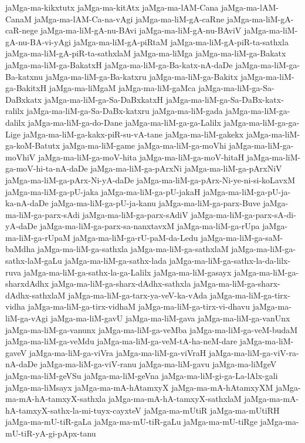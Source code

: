 {jaMga-ma-kikxtutx
jaMga-ma-kitAtx
jaMga-ma-lAM-Cana
jaMga-ma-lAM-CanaM
jaMga-ma-lAM-Ca-na-vAgi
jaMga-ma-liM-gA-caRne
jaMga-ma-liM-gA-caR-nege
jaMga-ma-liM-gA-nu-BAvi
jaMga-ma-liM-gA-nu-BAviV
jaMga-ma-liM-gA-nu-BA-vi-yAgi
jaMga-ma-liM-gA-piRtaM
jaMga-ma-liM-gA-piR-ta-sathxla
jaMga-ma-liM-gA-piR-ta-sathxlaM
jaMga-ma-liMga
jaMga-ma-liM-ga-Bakatx
jaMga-ma-liM-ga-BakatxH
jaMga-ma-liM-ga-Ba-katx-nA-daDe
jaMga-ma-liM-ga-Ba-katxnu
jaMga-ma-liM-ga-Ba-katxru
jaMga-ma-liM-ga-Bakitx
jaMga-ma-liM-ga-BakitxH
jaMga-ma-liMgaM
jaMga-ma-liM-gaMca
jaMga-ma-liM-ga-Sa-DaBxkatx
jaMga-ma-liM-ga-Sa-DaBxkatxH
jaMga-ma-liM-ga-Sa-DaBx-katx-ralilx
jaMga-ma-liM-ga-Sa-DaBx-katxru
jaMga-ma-liM-gada
jaMga-ma-liM-ga-dalilx
jaMga-ma-liM-ga-do-Dane
jaMga-ma-liM-ga-ga-Lalilx
jaMga-ma-liM-ga-ga-Lige
jaMga-ma-liM-ga-kakx-piR-su-vA-tane
jaMga-ma-liM-gakekx
jaMga-ma-liM-ga-koM-Batutx
jaMga-ma-liM-game
jaMga-ma-liM-ga-moVhi
jaMga-ma-liM-ga-moVhiV
jaMga-ma-liM-ga-moV-hita
jaMga-ma-liM-ga-moV-hitaH
jaMga-ma-liM-ga-moV-hi-ta-nA-daDe
jaMga-ma-liM-ga-pArxNi
jaMga-ma-liM-ga-pArxNiV
jaMga-ma-liM-ga-pArx-Ni-yA-daDe
jaMga-ma-liM-ga-pArx-Ni-ye-ni-si-koLavxM
jaMga-ma-liM-ga-pU-jaka
jaMga-ma-liM-ga-pU-jakaH
jaMga-ma-liM-ga-pU-ja-ka-nA-daDe
jaMga-ma-liM-ga-pU-ja-kanu
jaMga-ma-liM-ga-parx-Buve
jaMga-ma-liM-ga-parx-sAdi
jaMga-ma-liM-ga-parx-sAdiV
jaMga-ma-liM-ga-parx-sA-di-yA-daDe
jaMga-ma-liM-ga-parx-sa-nanxtavxM
jaMga-ma-liM-ga-rUpa
jaMga-ma-liM-ga-rUpaM
jaMga-ma-liM-ga-rU-paM-da-Ledu
jaMga-ma-liM-ga-saM-baMdha
jaMga-ma-liM-ga-sathxla
jaMga-ma-liM-ga-sathxlaM
jaMga-ma-liM-ga-sathx-laM-gaLu
jaMga-ma-liM-ga-sathx-lada
jaMga-ma-liM-ga-sathx-la-da-lilx-ruva
jaMga-ma-liM-ga-sathx-la-ga-Lalilx
jaMga-ma-liM-gasayx
jaMga-ma-liM-ga-sharxdAdhx
jaMga-ma-liM-ga-sharx-dAdhx-sathxla
jaMga-ma-liM-ga-sharx-dAdhx-sathxlaM
jaMga-ma-liM-ga-tarx-ya-veV-ka-vAda
jaMga-ma-liM-ga-tirx-vidha
jaMga-ma-liM-ga-tirx-vidhaM
jaMga-ma-liM-ga-tirx-vi-dhavu
jaMga-ma-liM-ga-vAgi
jaMga-ma-liM-gavU
jaMga-ma-liM-gava
jaMga-ma-liM-ga-vanUnx
jaMga-ma-liM-ga-vanunx
jaMga-ma-liM-ga-veMba
jaMga-ma-liM-ga-veM-budaM
jaMga-ma-liM-ga-veMdu
jaMga-ma-liM-ga-veM-tA-ha-neM-dare
jaMga-ma-liM-gaveV
jaMga-ma-liM-ga-viVra
jaMga-ma-liM-ga-viVraH
jaMga-ma-liM-ga-viV-ra-nA-daDe
jaMga-ma-liM-ga-viV-ranu
jaMga-ma-liM-gavu
jaMga-ma-liMgeV
jaMga-ma-liM-geVSu
jaMga-ma-liM-geVna
jaMga-ma-liM-gi-ga-La-lAlx-gali
jaMga-ma-liMsayx
jaMga-ma-mA-hAtamxyX
jaMga-ma-mA-hAtamxyXM
jaMga-ma-mA-hA-tamxyX-sathxla
jaMga-ma-mA-hA-tamxyX-sathxlaM
jaMga-ma-mA-hA-tamxyX-sathx-la-mi-tuyx-cayxteV
jaMga-ma-mUtiR
jaMga-ma-mUtiRH
jaMga-ma-mU-tiR-gaLa
jaMga-ma-mU-tiR-gaLu
jaMga-ma-mU-tiRge
jaMga-ma-mU-tiR-yA-gi-pApx-tanu
}
